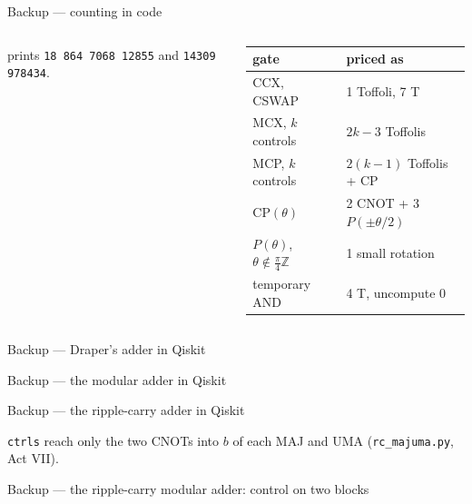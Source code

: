 \documentclass[aspectratio=169,11pt]{beamer}
\newcommand{\code}[2][]{}
\begin{document}
\begin{frame}[fragile]{Backup --- counting in code}
  \begin{columns}[T]
    \begin{column}{0.56\textwidth}
      \code[basicstyle=\ttfamily\footnotesize]{resources.py}
      {\small prints \texttt{18 864 7068 12855} and \texttt{14309 978434}.}
    \end{column}
    \begin{column}{0.4\textwidth}
      \scriptsize
      \renewcommand{\arraystretch}{1.1}
      \begin{tabular}{ll}
        \toprule
        gate & priced as \\
        \midrule
        CCX, CSWAP & 1 Toffoli, 7 T \\
        MCX, $k$ controls & $2k-3$ Toffolis \\
        MCP, $k$ controls & $2(k-1)$ Toffolis + CP \\
        $\mathrm{CP}(\theta)$ & 2 CNOT + 3 $P(\pm\theta/2)$ \\
        $P(\theta)$, $\theta\notin\frac\pi4\mathbb{Z}$ & 1 small rotation \\
        temporary AND & 4 T, uncompute 0 \\
        \bottomrule
      \end{tabular}
    \end{column}
  \end{columns}
\end{frame}

\begin{frame}[fragile]{Backup --- Draper's adder in Qiskit}
  \code[basicstyle=\ttfamily\scriptsize]{add_const.py}
\end{frame}

\begin{frame}[fragile]{Backup --- the modular adder in Qiskit}
  \code[basicstyle=\ttfamily\scriptsize]{c_add_mod.py}
\end{frame}

\begin{frame}[fragile]{Backup --- the ripple-carry adder in Qiskit}
  \code[basicstyle=\ttfamily\footnotesize]{rc_add.py}
  \vskip2mm
  {\small \texttt{ctrls} reach only the two CNOTs into $b$ of each MAJ and UMA (\texttt{rc\_majuma.py}, Act VII).}
\end{frame}

\begin{frame}[fragile]{Backup --- the ripple-carry modular adder: control on two blocks}
  \code[basicstyle=\ttfamily\fontsize{7.2}{8.3}\selectfont]{rc_c_add_mod.py}
\end{frame}
\end{document}
